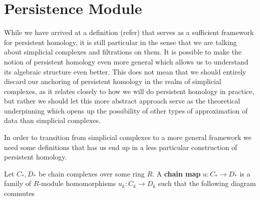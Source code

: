 \section{Persistence Module}
While we have arrived at a definition (refer) that serves as a sufficient framework for persistent homology, it is still particular in the sense that we are talking about simplicial complexes and filtrations on them. It is possible to make the notion of persistent homology even more general which allows us to understand its algebraic structure even better. This does not mean that we should entirely discard our anchoring of persistent homology in the realm of simplicial complexes, as it relates closely to how we will do persistent homology in practice, but rather we should let this more abstract approach serve as the theoretical underpinning which opens up the possibility of other types of approximation of data than simplicial complexes.

In order to transition from simplicial complexes to a more general framework we need some definitions that has us end up in  a less particular construction of persistent homology.
\begin{definition}
  Let $C_{*},D_{*}$ be chain complexes over some ring $R$. A \textbf{chain map} $u: C_{*} \to D_{*}$ is a family of $R$-module homomorphisms $u_{k}: C_{k} \to D_{k}$ such that the following diagram commutes
  \begin{center}
  \end{center}
\end{definition}

